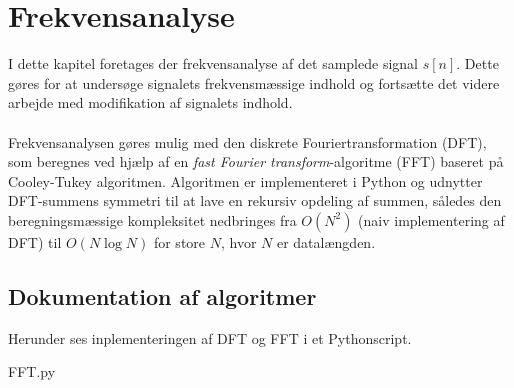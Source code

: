 \chapter{Frekvensanalyse}
I dette kapitel foretages der frekvensanalyse af det samplede signal $s[n]$. Dette gøres for at undersøge signalets frekvensmæssige indhold og fortsætte det videre arbejde med modifikation af signalets indhold.\\\\
Frekvensanalysen gøres mulig med den diskrete Fouriertransformation (DFT), som beregnes ved hjælp af en \textit{fast Fourier transform}-algoritme (FFT) baseret på Cooley-Tukey algoritmen. Algoritmen er implementeret i Python og udnytter DFT-summens symmetri til at lave en rekursiv opdeling af summen, således den beregningsmæssige kompleksitet nedbringes fra $O(N^2)$ (naiv implementering af DFT) til $O(N\log N)$ for store $N$, hvor $N$ er datalængden.
\section{Dokumentation af algoritmer}
Herunder ses inplementeringen af DFT og FFT i et Pythonscript.
\begin{lstinputlisting}{FFT.py}
\end{lstinputlisting}
